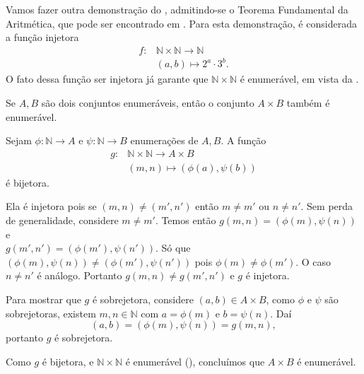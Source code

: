 \documentclass[../main.tex]{subfiles}
\begin{document}
\begin{obs}
    Vamos fazer outra demonstração do , admitindo-se o Teorema Fundamental da Aritmética, que pode ser encontrado em \textcite[p. 9]{santos}. Para esta demonstração, é considerada a função injetora 
    \begin{align*}
        f \colon &\mathbb{N} \times \mathbb{N} \to  \mathbb{N} \\ 
        &(a,b) \mapsto 2^a \cdot 3^b.
    \end{align*}
    O fato dessa função ser injetora já garante que $\mathbb{N} \times \mathbb{N}$ é enumerável, em vista da .
\end{obs}


\begin{teo}\label{enum-teo-ABEnumeraveisAxBEnumeravel}
    Se $A, B$ são dois conjuntos enumeráveis, então o conjunto $A \times B$ também é enumerável.
\end{teo}
\begin{dem}
    Sejam $\phi \colon \mathbb{N} \to A$ e $\psi \colon \mathbb{N} \to B$ enumerações de $A,B$. A função 
    \begin{align*}
        g \colon & \mathbb{N} \times \mathbb{N} \to A \times B \\
                 & (m,n) \mapsto (\phi(a),\psi(b))
    \end{align*}
    é bijetora.

    Ela é injetora pois se $(m,n) \neq (m',n')$ então $m \neq m'$ ou $n \neq n'$. Sem perda de generalidade, considere $m \neq m'$.
    Temos então $g(m,n) = (\phi(m),\psi(n))$ e \\ 
    $g(m',n') = (\phi(m'),\psi(n'))$. Só que $(\phi(m),\psi(n)) \neq (\phi(m'),\psi(n'))$ pois 
    $\phi(m) \neq \phi(m')$. O caso $n \neq n'$ é análogo. Portanto $g(m,n) \neq g(m',n')$ e $g$ é injetora.

    Para mostrar que $g$ é sobrejetora, considere $(a,b) \in A \times B$, como $\phi$ e $\psi$ são sobrejetoras, existem $m, n \in \mathbb{N}$ com 
    $a = \phi(m)$ e $b = \psi(n)$. Daí  
    \[ (a,b) = (\phi(m), \psi(n)) = g(m,n), \] 
    portanto $g$ é sobrejetora.

    Como $g$ é bijetora, e $\mathbb{N} \times \mathbb{N}$ é enumerável (), concluímos que $A \times B$ é enumerável.
\end{dem}
\end{document}
